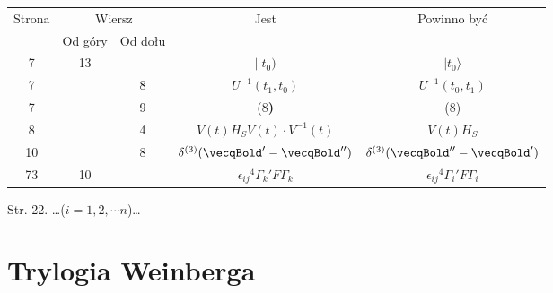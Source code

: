 \documentclass[a4paper,11pt]{article}
\numberwithin{equation}{section}
\begin{document}
\begin{center}

  \begin{tabular}{|c|c|c|c|c|}
    \hline
    Strona & \multicolumn{2}{c|}{Wiersz} & Jest
                              & Powinno być \\ \cline{2-3}
    & Od góry & Od dołu & & \\
    \hline
    7 & 13 & & $| \; t_{ 0 } )$ & $| t_{ 0 } \rangle$ \\
    7 & & 8 & $U^{ -1 }( t_{ 1 }, t_{ 0 } )$
           & $U^{ -1 }( t_{ 0 }, t_{ 1 } )$ \\
    7 & & 9 & (8\textbf{)} & (8) \\
    8 & & 4 & $V( t ) H_{ S } V( t ) \cdot V^{ -1 }( t )$
           & $V( t ) H_{ S }$ \\
    10 & & 8 & $\delta^{ ( 3 ) }( \vecqBold' - \vecqBold'' )$
           & $\delta^{ ( 3 ) }( \vecqBold'' - \vecqBold' )$ \\
    73 & 10 & & $\epsilon_{ i j }{}^{ 4 } \Gamma_{ k }{}' F \Gamma_{ k }$
           & $\epsilon_{ i j }{}^{ 4 } \Gamma_{ i }{}' F \Gamma_{ i }$ \\
    \hline
  \end{tabular}

\end{center}

\VerSpaceTwo




\noindent
Str. 22. \ldots ($i = 1, 2,\cdots n$)\ldots













\newpage

\section{Trylogia Weinberga}

\VerSpaceTwo



\end{document}
